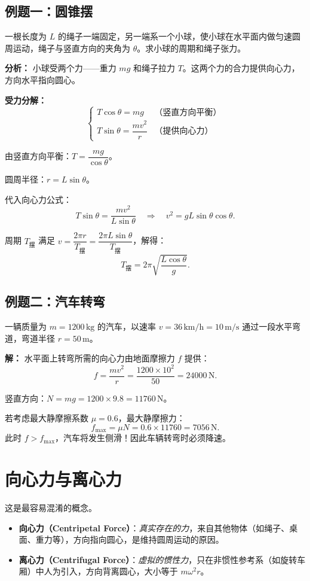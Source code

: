 \documentclass[12pt,a4paper]{article}
\begin{document}
\subsection{例题一：圆锥摆}

一根长度为 $L$ 的绳子一端固定，另一端系一个小球，使小球在水平面内做匀速圆周运动，绳子与竖直方向的夹角为 $\theta$。求小球的周期和绳子张力。

\textbf{分析：} 小球受两个力——重力 $mg$ 和绳子拉力 $T$。这两个力的合力提供向心力，方向水平指向圆心。

\textbf{受力分解：}
\[
\begin{cases}
T\cos\theta = mg & \text{（竖直方向平衡）}\\[6pt]
T\sin\theta = \dfrac{mv^2}{r} & \text{（提供向心力）}
\end{cases}
\]

由竖直方向平衡：$T = \dfrac{mg}{\cos\theta}$。

圆周半径：$r = L\sin\theta$。

代入向心力公式：
\[
T\sin\theta = \frac{mv^2}{L\sin\theta}
\quad\Longrightarrow\quad
v^2 = gL\sin\theta\cos\theta.
\]

周期 $T_{\text{摆}}$ 满足 $v = \dfrac{2\pi r}{T_{\text{摆}}} = \dfrac{2\pi L\sin\theta}{T_{\text{摆}}}$，解得：
\[
T_{\text{摆}} = 2\pi\sqrt{\frac{L\cos\theta}{g}}.
\]

\subsection{例题二：汽车转弯}

一辆质量为 $m=1200\,\text{kg}$ 的汽车，以速率 $v=36\,\text{km/h}=10\,\text{m/s}$ 通过一段水平弯道，弯道半径 $r=50\,\text{m}$。

\textbf{解：} 水平面上转弯所需的向心力由地面摩擦力 $f$ 提供：
\[
f = \frac{mv^2}{r} = \frac{1200\times 10^2}{50} = 24000\,\text{N}.
\]

竖直方向：$N = mg = 1200\times 9.8 = 11760\,\text{N}$。

若考虑最大静摩擦系数 $\mu=0.6$，最大静摩擦力：
\[
f_{\max} = \mu N = 0.6\times 11760 = 7056\,\text{N}.
\]
此时 $f>f_{\max}$，汽车将发生侧滑！因此车辆转弯时必须降速。

\section{向心力与离心力}

这是最容易混淆的概念。

\begin{itemize}
\item \textbf{向心力（Centripetal Force）}：\emph{真实存在的力}，来自其他物体（如绳子、桌面、重力等），方向指向圆心，是维持圆周运动的原因。
\item \textbf{离心力（Centrifugal Force）}：\emph{虚拟的惯性力}，只在非惯性参考系（如旋转车厢）中人为引入，方向背离圆心，大小等于 $m\omega^2 r$。
\end{itemize}
\end{document}
